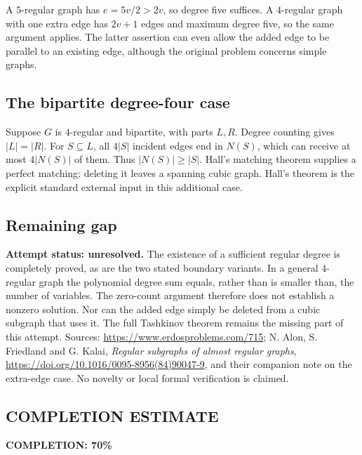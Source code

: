 A $5$-regular graph has $e=5v/2>2v$, so degree five suffices. A $4$-regular graph with one extra edge has $2v+1$ edges and maximum degree five, so the same argument applies. The latter assertion can even allow the added edge to be parallel to an existing edge, although the original problem concerns simple graphs.

\subsection*{The bipartite degree-four case}
Suppose $G$ is $4$-regular and bipartite, with parts $L,R$. Degree counting gives $|L|=|R|$. For $S\subseteq L$, all $4|S|$ incident edges end in $N(S)$, which can receive at most $4|N(S)|$ of them. Thus $|N(S)|\geq|S|$. Hall's matching theorem supplies a perfect matching; deleting it leaves a spanning cubic graph. Hall's theorem is the explicit standard external input in this additional case.

\subsection*{Remaining gap}
\textbf{Attempt status: unresolved.} The existence of a sufficient regular degree is completely proved, as are the two stated boundary variants. In a general $4$-regular graph the polynomial degree sum equals, rather than is smaller than, the number of variables. The zero-count argument therefore does not establish a nonzero solution. Nor can the added edge simply be deleted from a cubic subgraph that uses it. The full Tashkinov theorem remains the missing part of this attempt.
Sources: \url{https://www.erdosproblems.com/715}; N. Alon, S. Friedland and G. Kalai, \emph{Regular subgraphs of almost regular graphs}, \url{https://doi.org/10.1016/0095-8956(84)90047-9}, and their companion note on the extra-edge case. No novelty or local formal verification is claimed.

\subsection*{COMPLETION ESTIMATE}
\textbf{COMPLETION: 70\%}
